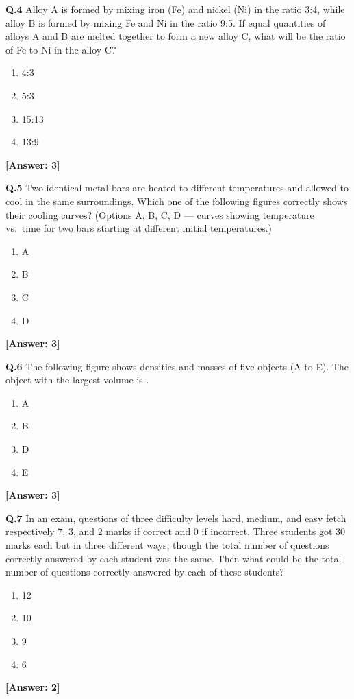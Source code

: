 \documentclass[12pt,a4paper]{article}
\newcommand{\ans}[1]{\quad\textcolor{anscolor}{\textbf{[Answer: #1]}}}
\begin{document}
\textbf{Q.4} Alloy A is formed by mixing iron (Fe) and nickel (Ni) in the ratio 3:4, while alloy B is formed by mixing Fe and Ni in the ratio 9:5. If equal quantities of alloys A and B are melted together to form a new alloy C, what will be the ratio of Fe to Ni in the alloy C?
\begin{enumerate}[label=\arabic*.]
\item 4:3 \item 5:3 \item 15:13 \item 13:9
\end{enumerate}\ans{3}

\textbf{Q.5} Two identical metal bars are heated to different temperatures and allowed to cool in the same surroundings. Which one of the following figures correctly shows their cooling curves? (Options A, B, C, D --- curves showing temperature vs.\ time for two bars starting at different initial temperatures.)
\begin{enumerate}[label=\arabic*.]
\item A \item B \item C \item D
\end{enumerate}\ans{3}

\textbf{Q.6} The following figure shows densities and masses of five objects (A to E). The object with the largest volume is \underline{\hspace{1cm}}.
\begin{enumerate}[label=\arabic*.]
\item A \item B \item D \item E
\end{enumerate}\ans{3}

\textbf{Q.7} In an exam, questions of three difficulty levels hard, medium, and easy fetch respectively 7, 3, and 2 marks if correct and 0 if incorrect. Three students got 30 marks each but in three different ways, though the total number of questions correctly answered by each student was the same. Then what could be the total number of questions correctly answered by each of these students?
\begin{enumerate}[label=\arabic*.]
\item 12 \item 10 \item 9 \item 6
\end{enumerate}\ans{2}
\end{document}

